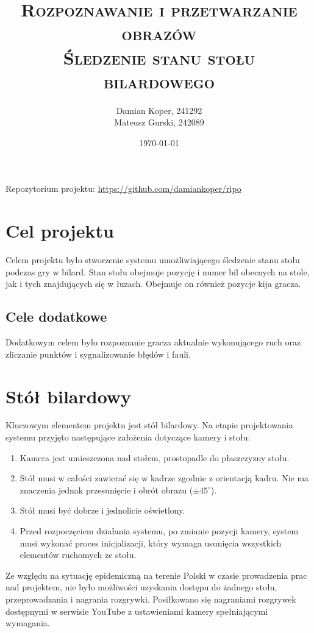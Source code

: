 \documentclass[12pt]{article}
\title{ 
    \vspace*{50mm}
    \textsc{
        \textbf{Rozpoznawanie i przetwarzanie obrazów}\\
        \large Śledzenie stanu stołu bilardowego 
    }
}
\author{
Damian Koper,  241292\\
Mateusz Gurski, 242089
}
\date{\today}
\begin{document}
\maketitle

\newpage
\setcounter{tocdepth}{2}
\localtableofcontents
\listoffigures
\lstlistoflistings
\vfill
Repozytorium projektu: \url{https://github.com/damiankoper/ripo}
\newpage

\section{Cel projektu}
Celem projektu było stworzenie systemu umożliwiającego śledzenie stanu stołu podczas gry w bilard. Stan stołu obejmuje pozycję i numer bil obecnych na stole, jak i tych znajdujących się w łuzach. Obejmuje on również pozycje kija gracza.

\subsection{Cele dodatkowe}
Dodatkowym celem było rozpoznanie gracza aktualnie wykonującego ruch oraz zliczanie punktów i sygnalizowanie błędów i fauli.

\section{Stół bilardowy}

Kluczowym elementem projektu jest stół bilardowy. Na etapie projektowania systemu przyjęto następujące założenia dotyczące kamery i stołu:

\begin{enumerate}[noitemsep]
    \item Kamera jest umieszczona nad stołem, prostopadle do płaszczyzny stołu.
    \item Stół musi w całości zawierać się w kadrze zgodnie z orientacją kadru. Nie ma znaczenia jednak przesunięcie i obrót obrazu ($\pm45^\circ$).
    \item Stół musi być dobrze i jednolicie oświetlony.
    \item Przed rozpoczęciem działania systemu, po zmianie pozycji kamery, system musi wykonać proces inicjalizacji, który wymaga usunięcia wszystkich elementów ruchomych ze stołu.
\end{enumerate}

Ze względu na sytuację epidemiczną na terenie Polski w czasie prowadzenia prac nad projektem, nie było możliwości uzyskania dostępu do żadnego stołu, przeprowadzania i nagrania rozgrywki. Posiłkowano się nagraniami rozgrywek dostępnymi w serwisie YouTube z ustawieniami kamery spełniającymi wymagania\cite{youtube}.
\end{document}
